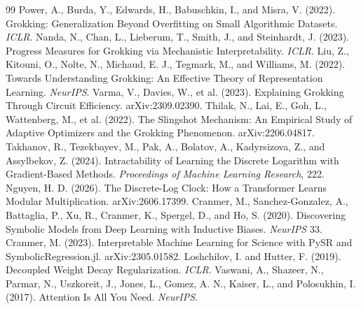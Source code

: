 \documentclass[twoside,11pt]{article}
\begin{document}
\begin{thebibliography}{99}
 Power, A., Burda, Y., Edwards, H., Babuschkin, I., and Misra, V. (2022). Grokking: Generalization Beyond Overfitting on Small Algorithmic Datasets. \emph{ICLR}.
 Nanda, N., Chan, L., Lieberum, T., Smith, J., and Steinhardt, J. (2023). Progress Measures for Grokking via Mechanistic Interpretability. \emph{ICLR}.
 Liu, Z., Kitouni, O., Nolte, N., Michaud, E. J., Tegmark, M., and Williams, M. (2022). Towards Understanding Grokking: An Effective Theory of Representation Learning. \emph{NeurIPS}.
 Varma, V., Davies, W., et al. (2023). Explaining Grokking Through Circuit Efficiency. arXiv:2309.02390.
 Thilak, N., Lai, E., Goh, L., Wattenberg, M., et al. (2022). The Slingshot Mechanism: An Empirical Study of Adaptive Optimizers and the Grokking Phenomenon. arXiv:2206.04817.
 Takhanov, R., Tezekbayev, M., Pak, A., Bolatov, A., Kadyrsizova, Z., and Assylbekov, Z. (2024). Intractability of Learning the Discrete Logarithm with Gradient-Based Methods. \emph{Proceedings of Machine Learning Research}, 222.
 Nguyen, H. D. (2026). The Discrete-Log Clock: How a Transformer Learns Modular Multiplication. arXiv:2606.17399.
 Cranmer, M., Sanchez-Gonzalez, A., Battaglia, P., Xu, R., Cranmer, K., Spergel, D., and Ho, S. (2020). Discovering Symbolic Models from Deep Learning with Inductive Biases. \emph{NeurIPS} 33.
 Cranmer, M. (2023). Interpretable Machine Learning for Science with PySR and SymbolicRegression.jl. arXiv:2305.01582.
 Loshchilov, I. and Hutter, F. (2019). Decoupled Weight Decay Regularization. \emph{ICLR}.
 Vaswani, A., Shazeer, N., Parmar, N., Uszkoreit, J., Jones, L., Gomez, A. N., Kaiser, L., and Polosukhin, I. (2017). Attention Is All You Need. \emph{NeurIPS}.
\end{thebibliography}
\end{document}

